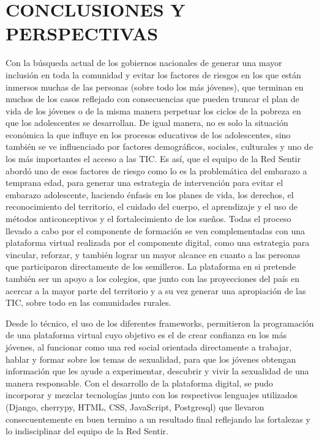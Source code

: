 \documentclass[journal,transmag]{IEEEtran}
\begin{document}
\section{CONCLUSIONES Y PERSPECTIVAS}\label{sec:conclusiones}
Con la búsqueda actual de los gobiernos nacionales de generar una mayor inclusión en toda la comunidad y evitar los factores de riesgos en los que están inmersos muchas de las personas (sobre todo los más jóvenes), que terminan en muchos de los casos reflejado con consecuencias que pueden truncar el plan de vida de los jóvenes o de la misma manera perpetuar los ciclos de la pobreza en que los adolescentes se desarrollan. De igual manera, no es solo la situación económica la que influye en los procesos educativos de los adolescentes, sino también se ve influenciado por factores demográficos, sociales, culturales y uno de los más importantes el acceso a las TIC. Es así, que el equipo de la Red Sentir abordó uno de esos factores de riesgo como lo es la problemática del embarazo a temprana edad, para generar una estrategia de intervención para evitar el embarazo adolescente, haciendo énfasis en los planes de vida, los derechos, el reconocimiento del territorio, el cuidado del cuerpo, el aprendizaje y el uso de métodos anticonceptivos y el fortalecimiento de los sueños. Todas el proceso llevado a cabo por el componente de formación se ven complementadas con una plataforma virtual realizada por el componente digital, como una estrategia para vincular, reforzar, y también lograr un mayor alcance en cuanto a las personas que participaron directamente de los semilleros. La plataforma en si pretende también ser un apoyo a los colegios, que junto con las proyecciones del país en acercar a la mayor parte del territorio y a su vez generar una apropiación de las TIC, sobre todo en las comunidades rurales.

Desde lo técnico, el uso de los diferentes frameworks, permitieron la programación de una plataforma virtual cuyo objetivo es el de crear confianza en los más jóvenes, al funcionar como una red social orientada directamente a trabajar, hablar y formar sobre los temas de sexualidad, para que los jóvenes obtengan información que les ayude a experimentar, descubrir y vivir la sexualidad de una manera responsable. Con el desarrollo de la plataforma digital, se pudo incorporar y mezclar tecnologías junto con los respectivos lenguajes utilizados (Django, cherrypy, HTML, CSS, JavaScript, Postgresql) que llevaron consecuentemente en buen termino a un resultado final reflejando las fortalezas y lo indisciplinar del equipo de la Red Sentir.
\end{document}
